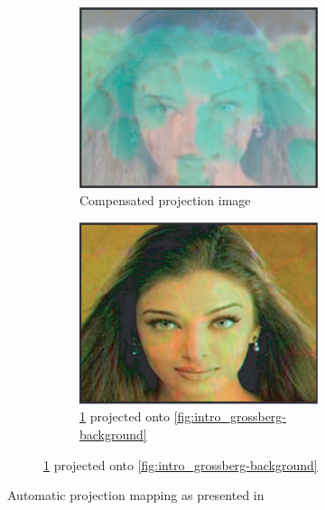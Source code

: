 \begin{figure}[ht]
\begin{subfigure}{0.8\textwidth}
        \begin{subfigure}{0.3\textwidth}
            \centering
            \includegraphics[width=\textwidth]{images/01-compensation_image.png}
            \caption{Compensated projection image}
            \label{fig:intro_grossberg-compensation}
        \end{subfigure}
        \hfill
        \begin{subfigure}{0.3\textwidth}
            \centering
            \includegraphics[width=\textwidth]{images/01-new_appearance.png}
            \caption{\ref{fig:intro_grossberg-compensation} projected onto \ref{fig:intro_grossberg-background}}
            \label{fig:intro_grossberg-new_appearance}
        \end{subfigure}
    \end{subfigure}
    \caption{Automatic projection mapping as presented in \citet{Grossberg2004}}
    \label{fig:intro_grossberg}
\end{figure}

